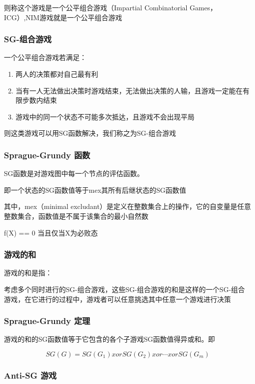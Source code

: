 则称这个游戏是一个公平组合游戏（Impartial Combinatorial Games， ICG）,NIM游戏就是一个公平组合游戏

\subsubsection{SG-组合游戏}

一个公平组合游戏若满足：

\begin{enumerate}
    \item 两人的决策都对自己最有利
    \item 当有一人无法做出决策时游戏结束，无法做出决策的人输，且游戏一定能在有限步数内结束
    \item 游戏中的同一个状态不可能多次抵达，且游戏不会出现平局
\end{enumerate}

则这类游戏可以用SG函数解决，我们称之为SG-组合游戏

\subsubsection{Sprague-Grundy 函数}

SG函数是对游戏图中每一个节点的评估函数。

即一个状态的SG函数值等于mex{其所有后继状态的SG函数值}

其中，mex（minimal excludant）是定义在整数集合上的操作，它的自变量是任意整数集合，函数值是不属于该集合的最小自然数

f(X) == 0 当且仅当X为必败态

\subsubsection{游戏的和}

游戏的和是指：

考虑多个同时进行的SG-组合游戏，这些SG-组合游戏的和是这样的一个SG-组合游戏，在它进行的过程中，游戏者可以任意挑选其中任意一个游戏进行决策

\subsubsection{Sprague-Grundy 定理}

游戏的和的SG函数值等于它包含的各个子游戏SG函数值得异或和。即

$$SG(G) = SG(G_1) xor SG(G_2) xor \cdots xor SG(G_m)$$

\subsubsection{Anti-SG 游戏}


